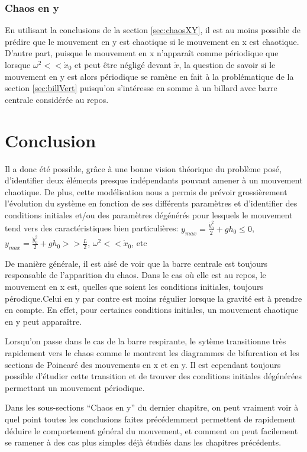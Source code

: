 \documentclass[a4paper]{report}
\begin{document}
\subsection{Chaos en y}
En utilisant la conclusions de la section \ref{sec:chaosXY}, il est au moins possible de prédire que le mouvement en y est chaotique si le mouvement en x est chaotique. D'autre part, puisque le mouvement en x n'apparaît comme périodique que lorsque \(\omega ^2 << \dot{x}_0 \) et peut être négligé devant \( \dot{x} \), la question de savoir si le mouvement en y est alors périodique se ramène en fait à la problématique de la section \ref{sec:billVert} puisqu'on s'intéresse en somme à un billard avec barre centrale considérée au repos.


\chapter{Conclusion}
Il a donc été possible, grâce à une bonne vision théorique du problème posé, d'identifier deux éléments presque indépendants pouvant amener à un mouvement chaotique. De plus, cette modélisation nous a permis de prévoir grossièrement l'évolution du système en fonction de ses différents paramètres et d'identifier des conditions initiales et/ou des paramètres dégénérés pour lesquels le mouvement tend vers des caractéristiques bien particulières: \(y_{max}=\frac{\dot{y}_0^2}{2} + gh_0 \leq 0\), \(y_{max}=\frac{\dot{y}_0^2}{2} + gh_0 >> \frac{L}{2}\), \(\omega ^2 << \dot{x}_0 \), etc

De manière générale, il est aisé de voir que la barre centrale est toujours responsable de l'apparition du chaos. Dans le cas où elle est au repos, le mouvement en x est, quelles que soient les conditions initiales, toujours pérodique.Celui en y par contre est moins régulier lorsque la gravité est à prendre en compte. En effet, pour certaines conditions initiales, un mouvement chaotique en y peut apparaître. 

Lorsqu'on passe dans le cas de la barre respirante, le sytème transitionne très rapidement vers le chaos comme le montrent les diagrammes de bifurcation et les sections de Poincaré des mouvements en x et en y. Il est cependant toujours possible d'étudier cette transition et de trouver des conditions initiales dégénérées permettant un mouvement périodique.

Dans les sous-sections ``Chaos en y'' du dernier chapitre, on peut vraiment voir à quel point toutes les conclusions faites précédemment permettent de rapidement déduire le comportement général du mouvement, et comment on peut facilement se ramener à des cas plus simples déjà étudiés dans les chapitres précédents.

\listoffigures
{}
\end{document}
